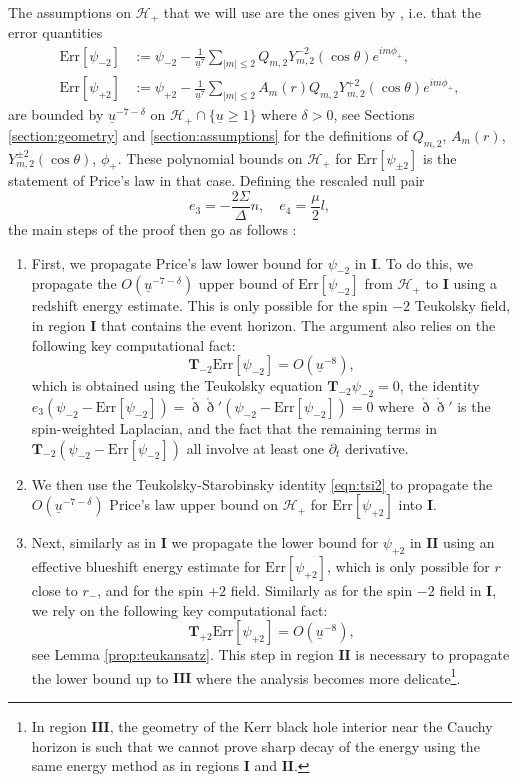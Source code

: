 \documentclass[reqno]{amsart}
\numberwithin{equation}{section}
\newcommand{\mch}{\mathcal{H}}
\newcommand{\ubar}{{\underline{u}}}
\newcommand{\errp}{\mathrm{Err}[\Psip]}
\newcommand{\errm}{\mathrm{Err}[\Psim]}
\newcommand{\drond}{\mathring{\eth}}
\newcommand{\teuk}{\mathbf{T}}
\newcommand{\un}{\mathbf{I}}
\newcommand{\deux}{\mathbf{II}}
\newcommand{\trois}{\mathbf{III}}
\newcommand{\Psip}{\psi_{+2}}
\newcommand{\psip}{\psi_{+2}}
\newcommand{\Psim}{\psi_{-2}}
\newcommand{\psim}{\psi_{-2}}
\newcommand{\sfrak}{2}
\newcommand{\ansatzm}{\frac{1}{\ubar^7}\sum_{|m|\leq2}Q_{m,\sfrak}Y_{m,\sfrak}^{-\sfrak}(\cos\theta)e^{im\phi_{+}}}
\newcommand{\ansatzp}{\frac{1}{\ubar^{7}}\sum_{|m|\leq2}A_m(r)Q_{m,\sfrak}Y_{m,\sfrak}^{+\sfrak}(\cos\theta)e^{im\phi_{+}}}
\theoremstyle{plain}
\theoremstyle{definition}
\theoremstyle{remark}
\numberwithin{equation}{section}
\begin{document}
The assumptions on $\mch_+$ that we will use are the ones given by \cite{pricelaw}, i.e. that the error quantities
\begin{align}
    \errm&:=\psim-\ansatzm,\\
    \errp&:=\psip-\ansatzp,\label{eqn:deferrp}
\end{align}
are bounded by $\ubar^{-7-\delta}$ on $\mch_+\cap\{\ubar\geq 1\}$ where $\delta>0$, see Sections \ref{section:geometry} and \ref{section:assumptions} for the definitions of $Q_{m,2}$, $A_m(r)$, $Y_{m,2}^{\pm 2}(\cos\theta)$, $\phi_+$. {These polynomial bounds on $\mch_+$ for $\mathrm{Err}[\psi_{\pm 2}]$ is the statement of Price's law in that case.} Defining the rescaled null pair 
$$e_3=-\frac{2\Sigma}{\Delta}n,\quad e_4=\frac{\mu}{2}l,$$
the main steps of the proof then go as follows :
\begin{enumerate}    \item First, we propagate Price's law lower bound for $\psim$ in $\un$. To do this, we propagate the $O(\ubar^{-7-\delta})$ upper bound of $\errm$ from $\mch_+$ to $\un$ using a redshift energy estimate. This is only possible for the spin $-2$ Teukolsky field, in region $\un$ that contains the event horizon. {The argument also relies on the following key computational fact: 
$$\teuk_{-2}\errm=O(\ubar^{-8}),$$
which is obtained using the Teukolsky equation $\teuk_{-2}\psim=0$, the identity $e_3(\psim-\errm)=\drond\drond'(\psim-\errm)=0$ where $\drond\drond'$ is the spin-weighted Laplacian, and the fact that the remaining terms in $\teuk_{-2}(\psim-\errm)$ all involve at least one $\partial_t$ derivative.} 
    \item We then use the Teukolsky-Starobinsky identity \eqref{eqn:tsi2} to propagate the $O(\ubar^{-7-\delta})$ Price's law upper bound on $\mch_+$ for $\errp$ into $\un$.
    \item Next, similarly as in $\un$ we propagate the lower bound for $\psip$ in $\deux$ using an effective blueshift energy estimate for $\errp$, which is only possible for $r$ close to $r_-$, and for the spin $+2$ field. {Similarly as for the spin $-2$ field in $\un$, we rely on the following key computational fact: 
    $$\teuk_{+2}\errp=O(\ubar^{-8}),$$
    see Lemma \ref{prop:teukansatz}.} This step in region $\deux$ is necessary to propagate the lower bound up to $\trois$ where the analysis becomes more delicate\footnote{{In region $\trois$, the geometry of the Kerr black hole interior near the Cauchy horizon is such that we cannot prove sharp decay of the energy using the same energy method as in regions $\un$ and $\deux$.}}.

\end{enumerate}
\end{document}
